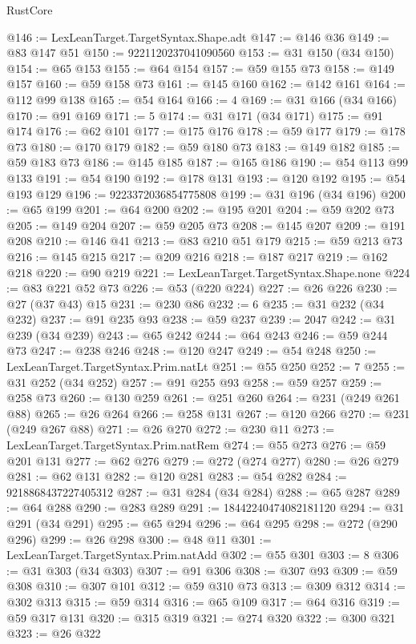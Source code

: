 \begin{lexlean}{RustCore}
\begin{coremodule}
@146 := LexLeanTarget.TargetSyntax.Shape.adt
@147 := @146 @36
@149 := @83 @147 @51
@150 := 9221120237041090560
@153 := @31 @150 (@34 @150)
@154 := @65 @153
@155 := @64 @154
@157 := @59 @155 @73
@158 := @149 @157
@160 := @59 @158 @73
@161 := @145 @160
@162 := @142 @161
@164 := @112 @99 @138
@165 := @54 @164
@166 := 4
@169 := @31 @166 (@34 @166)
@170 := @91 @169
@171 := 5
@174 := @31 @171 (@34 @171)
@175 := @91 @174
@176 := @62 @101
@177 := @175 @176
@178 := @59 @177
@179 := @178 @73
@180 := @170 @179
@182 := @59 @180 @73
@183 := @149 @182
@185 := @59 @183 @73
@186 := @145 @185
@187 := @165 @186
@190 := @54 @113 @99 @133
@191 := @54 @190
@192 := @178 @131
@193 := @120 @192
@195 := @54 @193 @129
@196 := 9223372036854775808
@199 := @31 @196 (@34 @196)
@200 := @65 @199
@201 := @64 @200
@202 := @195 @201
@204 := @59 @202 @73
@205 := @149 @204
@207 := @59 @205 @73
@208 := @145 @207
@209 := @191 @208
@210 := @146 @41
@213 := @83 @210 @51 @179
@215 := @59 @213 @73
@216 := @145 @215
@217 := @209 @216
@218 := @187 @217
@219 := @162 @218
@220 := @90 @219
@221 := LexLeanTarget.TargetSyntax.Shape.none
@224 := @83 @221 @52 @73
@226 := @53 (@220 @224)
@227 := @26 @226
@230 := @27 (@37 @43) @15
@231 := @230 @86
@232 := 6
@235 := @31 @232 (@34 @232)
@237 := @91 @235 @93
@238 := @59 @237
@239 := 2047
@242 := @31 @239 (@34 @239)
@243 := @65 @242
@244 := @64 @243
@246 := @59 @244 @73
@247 := @238 @246
@248 := @120 @247
@249 := @54 @248
@250 := LexLeanTarget.TargetSyntax.Prim.natLt
@251 := @55 @250
@252 := 7
@255 := @31 @252 (@34 @252)
@257 := @91 @255 @93
@258 := @59 @257
@259 := @258 @73
@260 := @130 @259
@261 := @251 @260
@264 := @231 (@249 @261 @88)
@265 := @26 @264
@266 := @258 @131
@267 := @120 @266
@270 := @231 (@249 @267 @88)
@271 := @26 @270
@272 := @230 @11
@273 := LexLeanTarget.TargetSyntax.Prim.natRem
@274 := @55 @273
@276 := @59 @201 @131
@277 := @62 @276
@279 := @272 (@274 @277)
@280 := @26 @279
@281 := @62 @131
@282 := @120 @281
@283 := @54 @282
@284 := 9218868437227405312
@287 := @31 @284 (@34 @284)
@288 := @65 @287
@289 := @64 @288
@290 := @283 @289
@291 := 18442240474082181120
@294 := @31 @291 (@34 @291)
@295 := @65 @294
@296 := @64 @295
@298 := @272 (@290 @296)
@299 := @26 @298
@300 := @48 @11
@301 := LexLeanTarget.TargetSyntax.Prim.natAdd
@302 := @55 @301
@303 := 8
@306 := @31 @303 (@34 @303)
@307 := @91 @306
@308 := @307 @93
@309 := @59 @308
@310 := @307 @101
@312 := @59 @310 @73
@313 := @309 @312
@314 := @302 @313
@315 := @59 @314
@316 := @65 @109
@317 := @64 @316
@319 := @59 @317 @131
@320 := @315 @319
@321 := @274 @320
@322 := @300 @321
@323 := @26 @322

\end{coremodule}
\end{lexlean}
